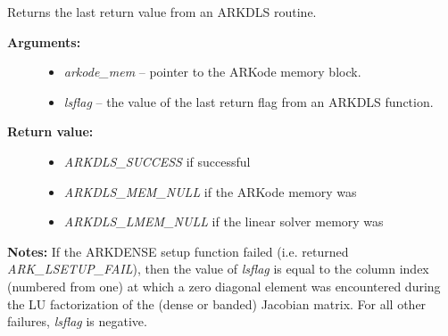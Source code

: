\documentclass[letterpaper,10pt,english]{sphinxmanual}
\begin{document}
\begin{fulllineitems}
\label{c_interface/User_callable:c.ARKDlsGetLastFlag}
Returns the last return value from an ARKDLS routine.
\begin{description}
\item[{\textbf{Arguments:}}] \leavevmode\begin{itemize}
\item {} 
\emph{arkode\_mem} -- pointer to the ARKode memory block.

\item {} 
\emph{lsflag} -- the value of the last return flag from an ARKDLS function.

\end{itemize}

\item[{\textbf{Return value:}}] \leavevmode\begin{itemize}
\item {} 
\emph{ARKDLS\_SUCCESS} if successful

\item {} 
\emph{ARKDLS\_MEM\_NULL} if the ARKode memory was 

\item {} 
\emph{ARKDLS\_LMEM\_NULL} if the linear solver memory was 

\end{itemize}

\end{description}

\textbf{Notes:} If the ARKDENSE setup function failed
(i.e. {\hyperref[c_interface/User_callable:c.ARKode]{\emph{}}} returned \emph{ARK\_LSETUP\_FAIL}), then the
value of \emph{lsflag} is equal to the column index (numbered from
one) at which a zero diagonal element was encountered during the LU
factorization of the (dense or banded) Jacobian matrix.  For all
other failures, \emph{lsflag} is negative.

\end{fulllineitems}

\end{document}

